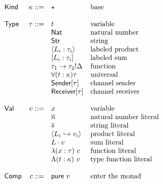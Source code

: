 \documentclass[12pt]{article}
\begin{document}
\[
\begin{array}{l r l l}
\textsf{Kind}   & \kappa ::= & \star                             & \text{base} \\
\\
\textsf{Type}   &   \tau ::= & t                                 & \text{variable} \\
                &            & \textsf{Nat}                      & \text{natural number} \\
                &            & \textsf{Str}                      & \text{string} \\
                &            & \langle L_i : \tau_i \rangle      & \text{labeled product} \\
                &            & [ L_i : \tau_i ]                  & \text{labeled sum} \\
                &            & \tau_1 \rightarrow \tau_2!\Delta  & \text{function} \\
                &            & \forall (t : \kappa) \tau         & \text{universal} \\
                &            & \textsf{Sender}[\tau]             & \text{channel sender} \\
                &            & \textsf{Receiver}[\tau]           & \text{channel receiver} \\
\\
\textsf{Val}    &      v ::= & x                                 & \text{variable} \\
                &            & \overline{n}                      & \text{natural number literal} \\
                &            & \overline{s}                      & \text{string literal} \\
                &            & \langle
                               L_i \hookrightarrow v_i
                               \rangle                           & \text{product literal} \\
                &            & L \cdot v                         & \text{sum literal} \\
                &            & \lambda (x : \tau) \ c            & \text{function literal} \\
                &            & \Lambda (t : \kappa) \ v          & \text{type function literal} \\
\\
\textsf{Comp}   &      c ::= & \textsf{pure} \ v                 & \text{enter the monad} \\

\end{array}\]
\end{document}
